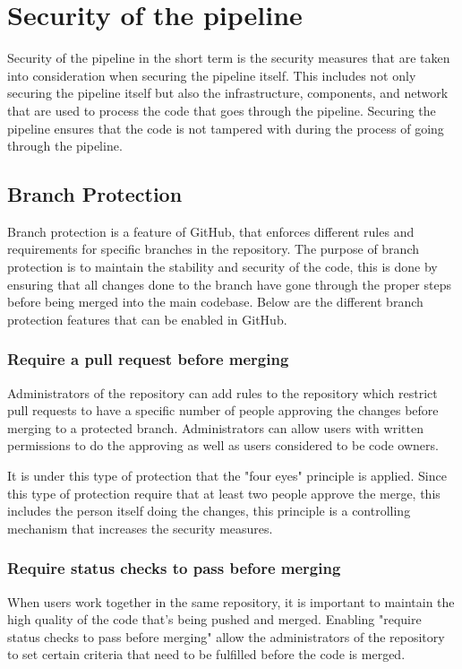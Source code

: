\section{Security of the pipeline}
Security of the pipeline in the short term is the security measures that are taken into consideration when securing the pipeline itself. This includes not only securing the pipeline itself but also the infrastructure, components, and network that are used to process the code that goes through the pipeline. Securing the pipeline ensures that the code is not tampered with during the process of going through the pipeline. 


\subsection{Branch Protection}
\label{branchprotection}
Branch protection is a feature of GitHub, that enforces different rules and requirements for specific branches in the repository. The purpose of branch protection is to maintain the stability and security of the code, this is done by ensuring that all changes done to the branch have gone through the proper steps before being merged into the main codebase. Below are the different branch protection features that can be enabled in GitHub. \cite{ProtectedBranches}
\\
\subsubsection{Require a pull request before merging}
Administrators of the repository can add rules to the repository which restrict pull requests to have a specific number of people approving the changes before merging to a protected branch. Administrators can allow users with written permissions to do the approving as well as users considered to be code owners. 

It is under this type of protection that the "four eyes" principle is applied. Since this type of protection require that at least two people approve the merge, this includes the person itself doing the changes, this principle is a controlling mechanism that increases the security measures. 
\\
\subsubsection{Require status checks to pass before merging}
When users work together in the same repository, it is important to maintain the high quality of the code that's being pushed and merged. Enabling "require status checks to pass before merging" allow the administrators of the repository to set certain criteria that need to be fulfilled before the code is merged. 
\newpage
